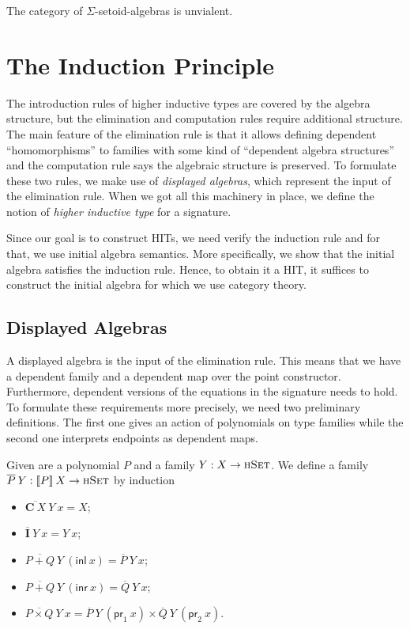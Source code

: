 \documentclass[9pt]{entcs}
\newcommand{\type}[1]{\textsc{#1}}
\newcommand{\term}[1]{\mathsf{#1}}
\newcommand{\constructor}[1]{\mathbf{#1}}
\newcommand{\hset}{\type{hSet}} %
\newcommand{\0}{\textbf{0}} %
\newcommand{\1}{\textbf{1}} %
\newcommand{\inl}{\term{inl}} %
\newcommand{\inr}{\term{inr}} %
\newcommand{\prl}{\term{pr}_1} %
\newcommand{\prr}{\term{pr}_2} %
\newcommand{\C}{\constructor{C}} %
\newcommand{\I}{\constructor{I}} %
\newcommand{\sumP}[2]{#1 + #2} %
\newcommand{\prodP}[2]{#1 \times #2} %
\newcommand{\semP}[1]{\llbracket #1 \rrbracket} %
\newcommand{\polydact}[2]{\overline{#1} \> #2}
\begin{document}
\begin{proposition}
The category of $\Sigma$-setoid-algebras is unvialent.
\end{proposition}

\section{The Induction Principle}
\label{sec:induction}
The introduction rules of higher inductive types are covered by the algebra structure, but the elimination and computation rules require additional structure.
The main feature of the elimination rule is that it allows defining dependent ``homomorphisms'' to families with some kind of ``dependent algebra structures'' and the computation rule says the algebraic structure is preserved.
To formulate these two rules, we make use of \emph{displayed algebras}, which represent the input of the elimination rule.
When we got all this machinery in place, we define the notion of \emph{higher inductive type} for a signature.

Since our goal is to construct HITs, we need verify the induction rule and for that, we use initial algebra semantics.
More specifically, we show that the initial algebra satisfies the induction rule.
Hence, to obtain it a HIT, it suffices to construct the initial algebra for which we use category theory.

\subsection{Displayed Algebras}
A displayed algebra is the input of the elimination rule.
This means that we have a dependent family and a dependent map over the point constructor.
Furthermore, dependent versions of the equations in the signature needs to hold.
To formulate these requirements more precisely, we need two preliminary definitions.
The first one gives an action of polynomials on type families while the second one interprets endpoints as dependent maps.

\begin{definition}
Given are a polynomial $P$ and a family $Y : X \rightarrow \hset$.
We define a family $\polydact{P}{Y} : \semP{P} \> X \rightarrow \hset$ by induction
\begin{itemize}
	\item $\polydact{\C \> X}{Y} \> x = X$;
	\item $\polydact{\I}{Y} \> x = Y \> x$;
	\item $\polydact{\sumP{P}{Q}}{Y} \> (\inl \> x) = \polydact{P}{Y} \> x$;
	\item $\polydact{\sumP{P}{Q}}{Y} \> (\inr \> x) = \polydact{Q}{Y} \> x$;
	\item $\polydact{\prodP{P}{Q}}{Y} \> x = \polydact{P}{Y} \> (\prl \> x) \times \polydact{Q}{Y} \> (\prr \> x)$.
\end{itemize}
\end{definition}
\end{document}
